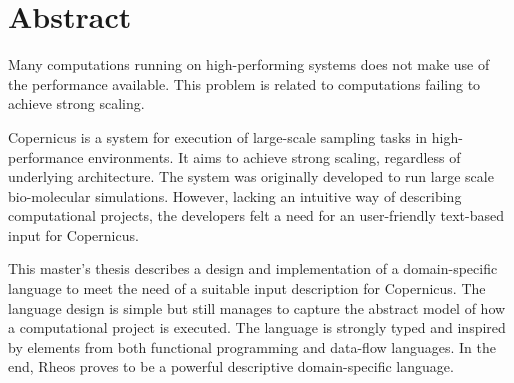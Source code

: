 \begingroup
\let\clearpage\relax
\let\cleardoublepage\relax
\let\cleardoublepage\relax

\chapter*{Abstract}

Many computations running on high-performing systems does not make use
of the performance available. This problem is related to computations
failing to achieve strong scaling.

Copernicus is a system for execution of large-scale sampling tasks in
high-performance environments. It aims to achieve strong scaling,
regardless of underlying architecture. The system was originally
developed to run large scale bio-molecular simulations. However,
lacking an intuitive way of describing computational projects, the
developers felt a need for an user-friendly text-based input for
Copernicus.

This master's thesis describes a design and implementation of a
domain-specific language to meet the need of a suitable input
description for Copernicus. The language design is simple but still
manages to capture the abstract model of how a computational project
is executed. The language is strongly typed and inspired by elements
from both functional programming and data-flow languages. In the end,
Rheos proves to be a powerful descriptive domain-specific language.

\endgroup			

\vfill
